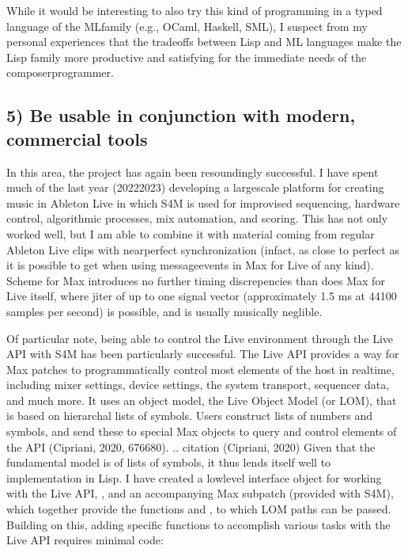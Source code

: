 \documentclass[letterpaper,10pt,english]{sphinxmanual}
\begin{document}
\sphinxAtStartPar
While it would be interesting to also try this kind of programming in a typed language
of the ML\sphinxhyphen{}family (e.g., OCaml, Haskell, SML), I suspect from my personal experiences that
the trade\sphinxhyphen{}offs between Lisp and ML languages make the Lisp family more
productive and satisfying for the immediate needs of the composer\sphinxhyphen{}programmer.


\subsection{5) Be usable in conjunction with modern, commercial tools}
\label{\detokenize{conclusion:be-usable-in-conjunction-with-modern-commercial-tools}}
\sphinxAtStartPar
In this area, the project has again been resoundingly successful.
I have spent much of the last year (2022\sphinxhyphen{}2023) developing a large\sphinxhyphen{}scale platform for creating music
in Ableton Live in which S4M is used for improvised sequencing, hardware control, algorithmic processes,
mix automation, and scoring. This has not only worked well, but I am able to combine
it with material coming from regular Ableton Live clips with near\sphinxhyphen{}perfect synchronization (infact,
as close to perfect as it is possible to get when using message\sphinxhyphen{}events in Max for Live of any kind).
Scheme for Max introduces no further timing discrepencies than does Max for Live itself, where
jiter of up to one signal vector (approximately 1.5 ms at 44100 samples per second) is possible, and is
usually musically neglible.

\sphinxAtStartPar
Of particular note, being able to control the Live environment through the Live API with S4M has
been particularly successful. The Live API provides a way for Max patches to programmatically control
most elements of the host in real\sphinxhyphen{}time, including mixer settings, device settings, the system transport,
sequencer data, and much more. It uses an object model, the Live Object Model (or LOM), that
is based on hierarchal lists of symbols. Users construct lists of numbers and symbols, and send
these to special Max objects to query and control elements of the API (Cipriani, 2020, 676\sphinxhyphen{}680).
.. citation (Cipriani, 2020)
Given that the fundamental model is of lists of symbols, it thus lends itself well to implementation in Lisp.
I have created a low\sphinxhyphen{}level interface object for working with the Live API, , and an accompanying
Max subpatch (provided with S4M), which together provide the functions
 and , to which LOM paths can be passed.
Building on this, adding specific functions to accomplish various tasks with the Live API
requires minimal code:
\end{document}

